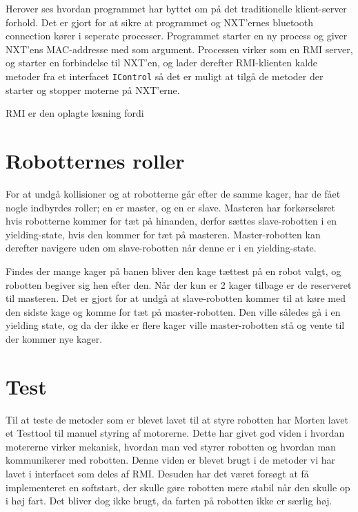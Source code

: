 
Herover ses hvordan programmet har byttet om på det traditionelle klient-server forhold. Det er gjort for at sikre at programmet og NXT’ernes bluetooth connection kører i seperate processer. Programmet starter en ny process og giver NXT’ens MAC-addresse med som argument. Processen virker som en RMI server, og starter en forbindelse til NXT’en, og lader derefter RMI-klienten kalde metoder fra et interfacet \texttt{IControl} så det er muligt at tilgå de metoder der starter og stopper moterne på NXT’erne.

RMI er den oplagte løsning fordi 

\section{Robotternes roller}
For at undgå kollisioner og at robotterne går efter de samme kager, har de fået nogle indbyrdes roller; en er master, og en er slave. Masteren har forkørselsret hvis robotterne kommer for tæt på hinanden, derfor sættes slave-robotten i en yielding-state, hvis den kommer for tæt på masteren. Master-robotten kan derefter navigere uden om slave-robotten når denne er i en yielding-state.

Findes der mange kager på banen bliver den kage tættest på en robot valgt, og robotten begiver sig hen efter den. Når der kun er 2 kager tilbage er de reserveret til masteren. Det er gjort for at undgå at slave-robotten kommer til at køre med den sidste kage og komme for tæt på master-robotten. Den ville således gå i en yielding state, og da der ikke er flere kager ville master-robotten stå og vente til der kommer nye kager.

\section{Test}
Til at teste de metoder som er blevet lavet til at styre robotten har Morten lavet et Testtool til manuel styring af motorerne. Dette har givet god viden i hvordan motererne virker mekanisk, hvordan man ved styrer robotten og hvordan man kommunikerer med robotten. Denne viden er blevet brugt i de metoder vi har lavet i interfacet som deles af RMI. Desuden har det været forsøgt at få implementeret en softstart, der skulle gøre robotten mere stabil når den skulle op i høj fart. Det bliver dog ikke brugt, da farten på robotten ikke er særlig høj.

